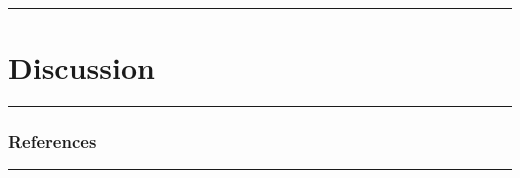 \documentclass[
  letterpaper,
  DIV=11,
  numbers=noendperiod,
  oneside]{scrartcl}
\begin{document}
\begin{center}\rule{0.5\linewidth}{0.5pt}\end{center}

\hypertarget{discussion}{%
\section{Discussion}\label{discussion}}

\begin{center}\rule{0.5\linewidth}{0.5pt}\end{center}

\hypertarget{references}{%
\subsubsection{References}\label{references}}

\begin{center}\rule{0.5\linewidth}{0.5pt}\end{center}
\end{document}
